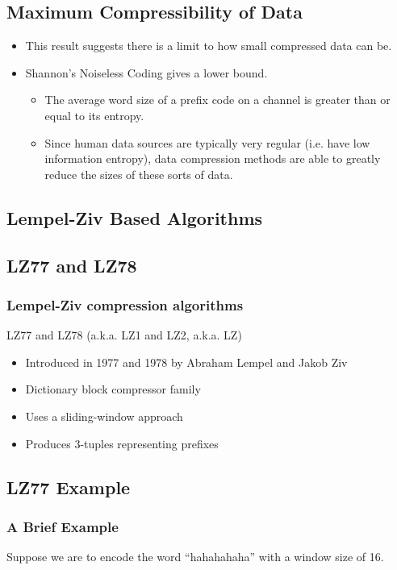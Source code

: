 \documentclass[mathserif,notheorems]{beamer} %
\begin{document}
\begin{frame}
  \subsection{Maximum Compressibility of Data}
  \begin{itemize}
  \item This result suggests there is a limit to how small compressed
    data can be.
  \item Shannon's Noiseless Coding gives a lower bound.
    \begin{itemize}
    \item The average word size of a prefix code on a channel is
      greater than or equal to its entropy.
    \item Since human data sources are typically very regular
      (i.e. have low information entropy), data compression methods
      are able to greatly reduce the sizes of these sorts of data.
    \end{itemize}
  \end{itemize}
\end{frame}

\begin{frame}
  \section{Lempel-Ziv Based Algorithms}
  \subsection{LZ77 and LZ78}
  \frametitle{Lempel-Ziv compression algorithms}
  LZ77 and LZ78 (a.k.a. LZ1 and LZ2, a.k.a. LZ)
  \begin{itemize}
  \item Introduced in 1977 and 1978 by Abraham Lempel and Jakob Ziv
  \item Dictionary block compressor family
  \item Uses a sliding-window approach
  \item Produces 3-tuples representing prefixes
  \end{itemize}
\end{frame}

\begin{frame}
  \subsection{LZ77 Example}
  \frametitle{A Brief Example}

  Suppose we are to encode the word ``hahahahaha'' with a window size
  of 16.
\end{frame}
\end{document}
